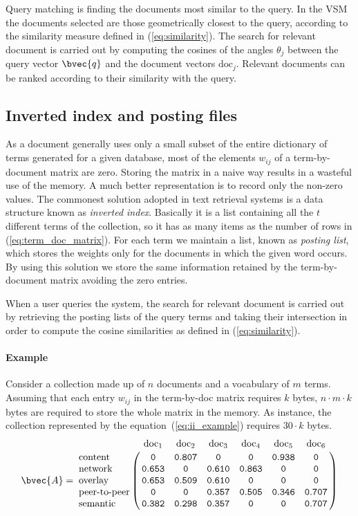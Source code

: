 Query matching is finding the documents most similar to the query. In the VSM the documents selected are those geometrically closest to the query, according to the similarity measure defined in (\ref{eq:similarity}). The search for relevant document is carried out by computing the cosines of the angles $\theta_{j}$ between the query vector $\bvec{q}$ and the document vectors $\mbox{doc}_j$. Relevant documents can be ranked according to their similarity with the query.

\subsection{Inverted index and posting files}
As a document generally uses only a small subset of the entire dictionary of terms generated for a given database, most of the elements $w_{ij}$ of a term-by-document matrix are zero. Storing the matrix in a naive way results in a wasteful use of the memory. A much better representation is to record only the non-zero values. The commonest solution adopted in text retrieval systems is a data structure known as \emph{inverted index}. Basically it is a list containing all the $t$ different terms of the collection, so it has as many items as the number of rows in (\ref{eq:term_doc_matrix}). For each term we maintain a list, known as \emph{posting list}, which stores the weights only for the documents in which the given word occurs. By using this solution we store the same information retained by the term-by-document matrix avoiding the zero entries.

When a user queries the system, the search for relevant document is carried out by retrieving the posting lists of the query terms and taking their intersection in order to compute the cosine similarities as defined in (\ref{eq:similarity}).

\paragraph{Example} Consider a collection made up of $n$ documents and a vocabulary of $m$ terms. Assuming that each entry $w_{ij}$ in the term-by-doc matrix requires $k$ bytes, $n \cdot m \cdot k$ bytes are required to store the whole matrix in the memory. As instance, the collection represented by the equation~(\ref{eq:ii_example}) requires $30 \cdot k$ bytes.
\begin{equation}\label{eq:ii_example}
 \bvec{A} = 
\bordermatrix{
                & \mbox{doc}_1 & \mbox{doc}_2  & \mbox{doc}_3 & \mbox{doc}_4 & \mbox{doc}_5 & \mbox{doc}_6 \cr
\mbox{content}  & \mathtt{0}     & \mathtt{0.807} & \mathtt{0}     & \mathtt{0}     & \mathtt{0.938} & \mathtt{0} \cr
\mbox{network}  & \mathtt{0.653} & \mathtt{0}     & \mathtt{0.610} & \mathtt{0.863} & \mathtt{0}     & \mathtt{0} \cr
\mbox{overlay}  & \mathtt{0.653} & \mathtt{0.509} & \mathtt{0.610} & \mathtt{0}     & \mathtt{0}     & \mathtt{0} \cr
\mbox{peer-to-peer} & \mathtt{0} & \mathtt{0}     & \mathtt{0.357} & \mathtt{0.505} & \mathtt{0.346} & \mathtt{0.707}\cr
\mbox{semantic} & \mathtt{0.382} & \mathtt{0.298} & \mathtt{0.357} & \mathtt{0}     & \mathtt{0}     & \mathtt{0.707}\cr
}
\end{equation}

